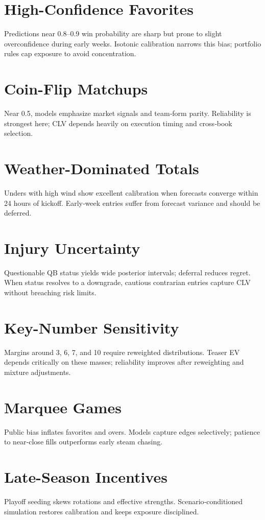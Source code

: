 \documentclass[12pt]{report}  %
\numberwithin{equation}{section}
\theoremstyle{plain}
\theoremstyle{definition}
\theoremstyle{remark}
\begin{document}
\section{High-Confidence Favorites}
Predictions near 0.8–0.9 win probability are sharp but prone to slight overconfidence during early weeks. Isotonic calibration narrows this bias; portfolio rules cap exposure to avoid concentration.

\section{Coin-Flip Matchups}
Near 0.5, models emphasize market signals and team‑form parity. Reliability is strongest here; CLV depends heavily on execution timing and cross‑book selection.

\section{Weather-Dominated Totals}
Unders with high wind show excellent calibration when forecasts converge within 24 hours of kickoff. Early‑week entries suffer from forecast variance and should be deferred.

\section{Injury Uncertainty}
Questionable QB status yields wide posterior intervals; deferral reduces regret. When status resolves to a downgrade, cautious contrarian entries capture CLV without breaching risk limits.

\section{Key-Number Sensitivity}
Margins around 3, 6, 7, and 10 require reweighted distributions. Teaser EV depends critically on these masses; reliability improves after reweighting and mixture adjustments.

\section{Marquee Games}
Public bias inflates favorites and overs. Models capture edges selectively; patience to near‑close fills outperforms early steam chasing.

\section{Late-Season Incentives}
Playoff seeding skews rotations and effective strengths. Scenario‑conditioned simulation restores calibration and keeps exposure disciplined.
\end{document}
